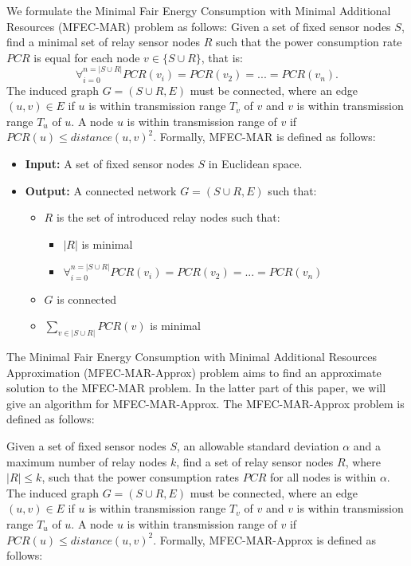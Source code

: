 We formulate the Minimal Fair Energy Consumption with Minimal Additional Resources (MFEC-MAR) problem as follows: Given a set of fixed sensor nodes $S$, find a minimal set of relay sensor nodes $R$ such that the power consumption rate $PCR$ is equal for each node $v \in \{S \cup R\}$, that is:
\begin{equation*}
\forall_{i=0}^{n=|S \cup R|} PCR(v_i) = PCR(v_2)=...=PCR(v_n).
\end{equation*}
The induced graph $G=(S \cup R,E)$ must be connected, where an edge $(u,v) \in E$ if $u$ is within transmission range $T_v$ of $v$ and $v$ is within transmission range $T_u$ of $u$. A node $u$ is within transmission range of $v$ if  $PCR(u)\leq distance(u,v)^2$.
Formally, MFEC-MAR is defined as follows:
\begin{itemize}
 \item \textbf{Input:} A set of fixed sensor nodes $S$ in Euclidean space.
\item \textbf{Output:} A connected network $G = (S \cup R, E)$ such that:
	\begin{itemize}
		\item $R$ is the set of introduced relay nodes such that:
		\begin{itemize}
		\item $|R|$ is minimal
		\item $\forall_{i=0}^{n=|S \cup R|} PCR(v_i) = PCR(v_2)=...=PCR(v_n)$
		\end{itemize}
		\item $G$ is connected
		\item  $\sum_{v \in |S \cup R|} PCR(v)$ is minimal
	\end{itemize}
\end{itemize}

The Minimal Fair Energy Consumption with Minimal Additional Resources Approximation (MFEC-MAR-Approx) problem aims to find an approximate solution to the MFEC-MAR problem. In the latter part of this paper, we will give an algorithm for MFEC-MAR-Approx. The MFEC-MAR-Approx problem is defined as follows:

Given a set of fixed sensor nodes $S$, an allowable standard deviation $\alpha$ and a maximum number of relay nodes $k$, find a set of relay sensor nodes $R$, where $|R|\leq k$, such that the power consumption rates $PCR$ for all nodes is within $\alpha$. The induced graph $G=(S \cup R,E)$ must be connected, where an edge $(u,v) \in E$ if $u$ is within transmission range $T_v$ of $v$ and $v$ is within transmission range $T_u$ of $u$. A node $u$ is within transmission range of $v$ if  $PCR(u)\leq distance(u,v)^2$.
Formally, MFEC-MAR-Approx is defined as follows:

